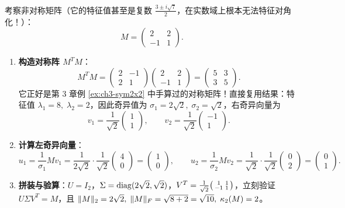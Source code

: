 \begin{example}
\label{ex:ch4-svd-2x2}
考察非对称矩阵（它的特征值甚至是复数 $\frac{3 \pm i\sqrt{7}}{2}$，在实数域上根本无法特征对角化！）：
\[
  M = \begin{pmatrix} 2 & 2 \\ -1 & 1 \end{pmatrix}.
\]
\begin{enumerate}
  \item \textbf{构造对称阵 $M^T M$}：
  \[
    M^T M = \begin{pmatrix} 2 & -1 \\ 2 & 1 \end{pmatrix}\begin{pmatrix} 2 & 2 \\ -1 & 1 \end{pmatrix} = \begin{pmatrix} 5 & 3 \\ 3 & 5 \end{pmatrix}.
  \]
  它正好是第 3 章例 \ref{ex:ch3-sym2x2} 中手算过的对称矩阵！直接复用结果：特征值 $\lambda_1 = 8,\; \lambda_2 = 2$，因此奇异值为 $\sigma_1 = 2\sqrt{2},\; \sigma_2 = \sqrt{2}$，右奇异向量为
  \[
    v_1 = \frac{1}{\sqrt{2}}\begin{pmatrix} 1 \\ 1 \end{pmatrix}, \qquad
    v_2 = \frac{1}{\sqrt{2}}\begin{pmatrix} -1 \\ 1 \end{pmatrix}.
  \]
  \item \textbf{计算左奇异向量}：
  \[
    u_1 = \frac{1}{\sigma_1} M v_1 = \frac{1}{2\sqrt{2}}\cdot \frac{1}{\sqrt{2}}\begin{pmatrix} 4 \\ 0 \end{pmatrix} = \begin{pmatrix} 1 \\ 0 \end{pmatrix}, \qquad
    u_2 = \frac{1}{\sigma_2} M v_2 = \frac{1}{\sqrt{2}}\cdot \frac{1}{\sqrt{2}}\begin{pmatrix} 0 \\ 2 \end{pmatrix} = \begin{pmatrix} 0 \\ 1 \end{pmatrix}.
  \]
  \item \textbf{拼装与验算}：$U = I_2$，$\Sigma = \operatorname{diag}(2\sqrt{2}, \sqrt{2})$，$V^T = \frac{1}{\sqrt{2}}\begin{psmallmatrix}1 & 1 \\ -1 & 1\end{psmallmatrix}$，立刻验证 $U\Sigma V^T = M$，且 $\|M\|_2 = 2\sqrt{2},\; \|M\|_F = \sqrt{8+2} = \sqrt{10},\; \kappa_2(M) = 2$。
\end{enumerate}
\end{example}

